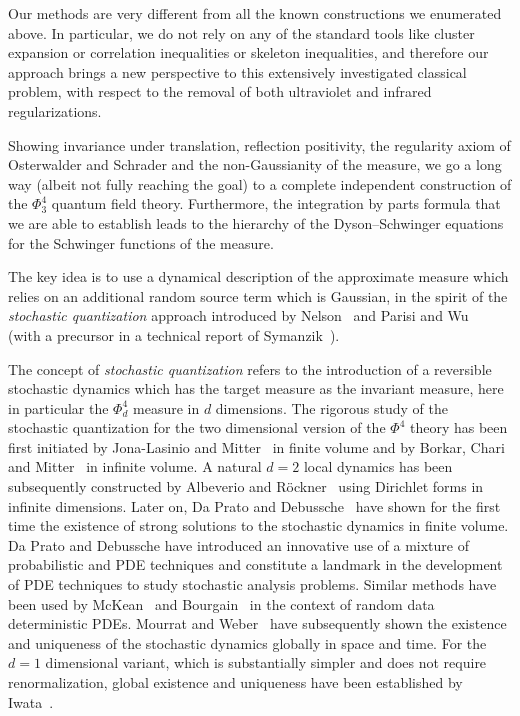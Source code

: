 \documentclass[a4paper,11pt]{article}
\newcommand{\tmtextit}[1]{{\itshape{#1}}}
\numberwithin{equation}{section}
\begin{document}
 Our methods are  very different from all the known constructions we
enumerated above. In particular, we do not rely on any of the standard tools
like cluster expansion or correlation inequalities or skeleton inequalities, and therefore our approach
brings a new perspective to this extensively investigated classical problem,
with respect to the removal of both ultraviolet and infrared regularizations.

Showing  invariance under translation, reflection positivity, the regularity
axiom of Osterwalder and Schrader  and the non-Gaussianity of the measure, we go a long
way (albeit not fully reaching the goal) to a complete independent construction of the $\Phi^4_3$ quantum field theory.
Furthermore, the integration by parts formula that we are able to establish leads to the hierarchy of the
Dyson--Schwinger equations for the Schwinger functions of the measure.

The key idea is to use a dynamical description of the approximate measure which
relies on an additional random source term which is Gaussian, in the spirit of the
\tmtextit{stochastic quantization} approach introduced by
Nelson~{\cite{nelson1966,MR0214150}} and Parisi and
Wu~{\cite{parisi_perturbation_1981}} (with a precursor in a technical report
of Symanzik~{\cite{Symanzik1964}}).

The concept of \emph{stochastic quantization} refers to the introduction of a reversible
stochastic dynamics which has the target measure as the invariant measure, here in
particular the $\Phi^4_d$ measure in $d$ dimensions. The rigorous study of
the stochastic quantization for the two dimensional version of the $\Phi^4$ theory
has been first initiated by Jona-Lasinio and
Mitter~{\cite{jona-lasinio_stochastic_1985}} in finite volume and by Borkar,
Chari and Mitter~{\cite{borkar_stochastic_1988}} in infinite volume. A natural
$d = 2$ local dynamics has been subsequently constructed by Albeverio and
R{\"o}ckner~{\cite{albeverio_stochastic_1991}} using Dirichlet forms in
infinite dimensions. Later on, Da Prato and
Debussche~{\cite{da_prato_strong_2003}} have shown for the first time the
existence of strong solutions to the stochastic dynamics in finite volume.
Da Prato and Debussche have introduced an innovative use of a mixture of probabilistic and
PDE techniques and constitute a landmark in the development of PDE techniques
to study stochastic analysis problems.  Similar methods have been used by McKean~\cite{mckean_1995,mckean_1995_err} and Bourgain~\cite{bourgain_invariant_1996} in the context of random data deterministic PDEs. Mourrat and
Weber~{\cite{MW17}} have subsequently shown the existence and
uniqueness of the stochastic dynamics globally in space and time. For the $d =
1$ dimensional variant, which is substantially simpler and does not require
renormalization, global existence and uniqueness have been established by
Iwata~{\cite{iwata_infinite_1987}}.
\end{document}
